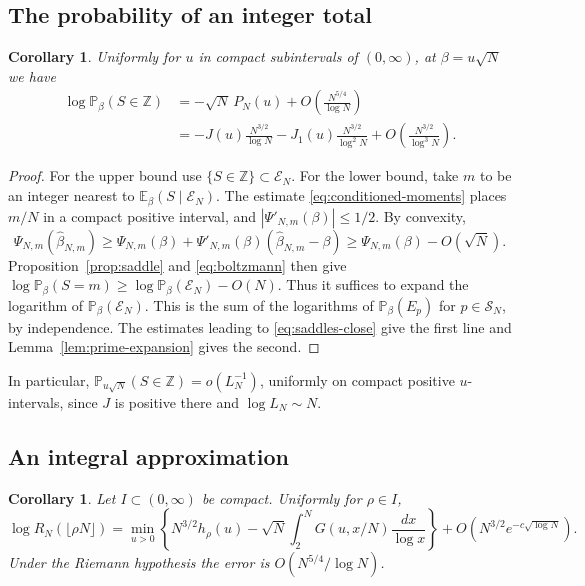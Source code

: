 \documentclass[11pt]{amsart}
\newtheorem{corollary}[theorem]{Corollary}
\theoremstyle{remark}
\newcommand{\Pp}{\mathbb P}
\newcommand{\Ee}{\mathbb E}
\newcommand{\Z}{\mathbb Z}
\begin{document}
\subsection{The probability of an integer total}

\begin{corollary}
\label{cor:integer-total}
Uniformly for \(u\) in compact subintervals of \((0,\infty)\), at \(\beta=u\sqrt N\) we have
\begin{align*}
 \log\Pp_\beta(S\in\Z)
  &=-\sqrt N\,P_N(u)+O\!\left(\frac{N^{5/4}}{\log N}\right)\\
  &=-J(u)\frac{N^{3/2}}{\log N}
    -J_1(u)\frac{N^{3/2}}{\log^2 N}
    +O\!\left(\frac{N^{3/2}}{\log^3 N}\right).
\end{align*}
\end{corollary}

\begin{proof}
For the upper bound use \(\{S\in\Z\}\subset\mathcal E_N\). For the lower bound, take \(m\) to be an integer nearest to \(\Ee_\beta(S\mid\mathcal E_N)\). The estimate \eqref{eq:conditioned-moments} places \(m/N\) in a compact positive interval, and \(|\Psi'_{N,m}(\beta)|\le1/2\). By convexity,
\[
 \Psi_{N,m}(\widehat\beta_{N,m})\ge
 \Psi_{N,m}(\beta)+\Psi'_{N,m}(\beta)(\widehat\beta_{N,m}-\beta)
 \ge\Psi_{N,m}(\beta)-O(\sqrt N).
\]
Proposition~\ref{prop:saddle} and \eqref{eq:boltzmann} then give
\(\log\Pp_\beta(S=m)\ge\log\Pp_\beta(\mathcal E_N)-O(N)\).
Thus it suffices to expand the logarithm of \(\Pp_\beta(\mathcal E_N)\). This is the sum of the logarithms of \(\Pp_\beta(E_p)\) for \(p\in\mathcal S_N\), by independence. The estimates leading to \eqref{eq:saddles-close} give the first line and Lemma~\ref{lem:prime-expansion} gives the second.
\end{proof}

In particular, \(\mathbb P_{u\sqrt N}(S\in\mathbb Z)=o(L_N^{-1})\),
uniformly on compact positive \(u\)-intervals, since \(J\) is positive
there and \(\log L_N\sim N\).

\subsection{An integral approximation}

\begin{corollary}
\label{cor:prime-integral}
Let \(I\subset(0,\infty)\) be compact. Uniformly for \(\rho\in I\),
\[
 \log R_N(\lfloor\rho N\rfloor)
 =\min_{u>0}\left\{N^{3/2}h_\rho(u)
    -\sqrt N\int_2^N G(u,x/N)\frac{dx}{\log x}\right\}
    +O\!\left(N^{3/2}e^{-c\sqrt{\log N}}\right).
\]
Under the Riemann hypothesis the error is \(O(N^{5/4}/\log N)\).
\end{corollary}
\end{document}

